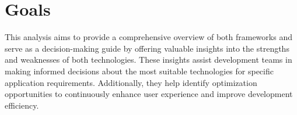 \section{Goals}
This analysis aims to provide a comprehensive overview of both frameworks and serve as a decision-making guide by offering valuable insights into the strengths and weaknesses of both technologies. These insights assist development teams in making informed decisions about the most suitable technologies for specific application requirements. Additionally, they help identify optimization opportunities to continuously enhance user experience and improve development efficiency.



